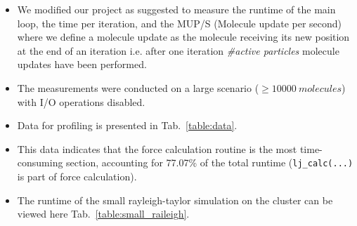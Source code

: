 \documentclass{article}
\begin{document}
\begin{itemize}
    \item We modified our project as suggested to measure the runtime of the main loop, the time per iteration, and the MUP/S (Molecule update per second) where we define a molecule update as the molecule receiving its new position at the end of an iteration i.e. after one iteration \textit{\#active particles} molecule updates have been performed.
    \item The measurements were conducted on a large scenario ($\geq 10000\ molecules$) with I/O operations disabled.
    \item Data for profiling is presented in Tab.\ \ref{table:data}.
    \item This data indicates that the force calculation routine is the most time-consuming section, accounting for 77.07\% of the total runtime (\texttt{lj\_calc(...)} is part of force calculation).
    \item The runtime of the small rayleigh-taylor simulation on the cluster can be viewed here Tab.\ \ref{table:small_raileigh}.
\end{itemize}
\end{document}
